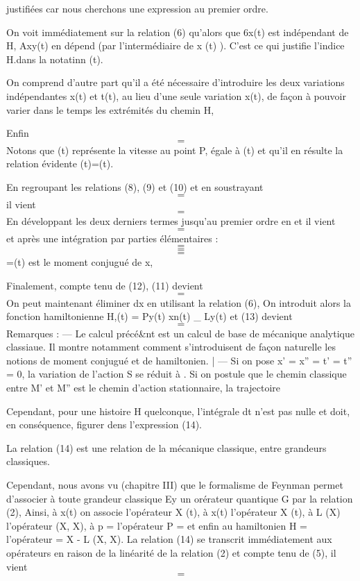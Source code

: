 justifiées car nous cherchons une expression au premier ordre.

On voit immédiatement sur la relation (6) qu'alors que 6x(t) est indépendant
de H, Axy(t) en dépend (par l'intermédiaire de x (t) ). C'est ce qui justifie l'indice H.dans la notatinn (t).

On comprend d'autre part qu'il a été nécessaire d'introduire les deux variations indépendantes x(t) et t(t), au lieu d'une seule variation x(t),
de façon à pouvoir varier dans le temps les extrémités du chemin H,

Enfin
\[
\tag{10}=
\]
Notons que (t) représente la vitesse au point P, égale à
(t) et qu'il en résulte la relation évidente
(t)=(t).

En regroupant les relations (8), (9) et (10) et en soustrayant
\[
=
\]
il vient
\[
\tag{11}=
\]
En développant les deux derniers termes jusqu'au premier ordre en  et
il vient
\[
=
\]
et après une intégration par parties élémentaires :
\[
\tag{12}=
\]
\[
=
\]
\[
=
\]
=(t) est le moment conjugué de x,

Finalement, compte tenu de (12), (11) devient
\[
\tag{13}=
\]
On peut maintenant éliminer dx en utilisant la relation (6),
On introduit alors la fonction hamiltonienne H,(t) = Py(t) xn(t) _ Ly(t)
et (13) devient
\[
\tag{14}=
\]
Remarques :
— Le calcul précé&nt est un calcul de base de mécanique analytique classiaue.
Il montre notamment comment s'introduisent de façon naturelle les notions de
moment conjugué et de hamiltonien. |
— Si on pose x' = x'' = t' = t'' = 0, la variation de l'action S se
réduit à . Si on postule que le chemin classique
entre M' et M'' est le chemin d'action stationnaire, la trajectoire

Cependant, pour une histoire H quelconque, l'intégrale
 dt n'est pas nulle et doit, en conséquence,
figurer dens l'expression (14).

La relation (14) est une relation de la mécanique classique,
entre grandeurs classiques.

Cependant, nous avons vu (chapitre III) que le formalisme de
Feynman permet d'associer à toute grandeur classique Ey un orérateur
quantique G par la relation (2), Ainsi, à x(t) on associe l'opérateur
X (t), à x(t) l'opérateur X (t), à L (X) l'opérateur  (X, X),
à p = l'opérateur P =  et enfin au hamiltonien H = 
l'opérateur = X - L (X, X).
La relation (14) se transcrit immédiatement aux opérateurs en
raison de la linéarité de la relation (2) et compte tenu de (5), il vient
\[
\tag{15}=
\]

